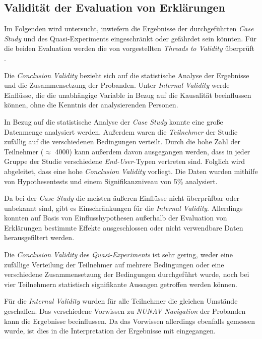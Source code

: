 \subsection{Validität der Evaluation von Erklärungen}

Im Folgenden wird untersucht, inwiefern die Ergebnisse der durchgeführten \textit{Case Study} und des Quasi-Experiments eingeschränkt oder gefährdet sein könnten. Für die beiden Evaluation werden die von \citeauthor{wohlin2012experimentation} vorgestellten \textit{Threads to Validity} überprüft \cite{wohlin2012experimentation}.

Die \textit{Conclusion Validity} bezieht sich auf die statistische Analyse der Ergebnisse und die Zusammensetzung der Probanden. Unter \textit{Internal Validity} werde Einflüsse, die die unabhängige Variable in Bezug auf die Kausalität beeinflussen können, ohne die Kenntnis der analysierenden Personen.

In Bezug auf die statistische Analyse der \textit{Case Study} konnte eine große Datenmenge analysiert werden. Außerdem waren die \textit{Teilnehmer} der Studie zufällig auf die verschiedenen Bedingungen verteilt. Durch die hohe Zahl der Teilnehmer ($\approx$ 4000) kann außerdem davon ausgegangen werden, dass in jeder Gruppe der Studie verschiedene \textit{End-User}-Typen vertreten sind. Folglich wird abgeleitet, dass eine hohe \textit{Conclusion Validity} vorliegt. Die Daten wurden mithilfe von Hypothesentests und einem Signifikanzniveau von 5\% analysiert.

Da bei der \textit{Case-Study} die meisten äußeren Einflüsse nicht überprüfbar oder unbekannt sind, gibt es Einschränkungen für die \textit{Internal Validity}. Allerdings konnten auf Basis von Einflusshypothesen außerhalb der Evaluation von Erklärungen bestimmte Effekte ausgeschlossen oder nicht verwendbare Daten herausgefiltert werden.

\smallskip

Die \textit{Conclusion Validity} des \textit{Quasi-Experiments} ist sehr gering, weder eine zufällige Verteilung der Teilnehmer auf mehrere Bedingungen oder eine verschiedene Zusammensetzung der Bedingungen durchgeführt wurde, noch bei vier Teilnehmern statistisch signifikante Aussagen getroffen werden können.

Für die \textit{Internal Validity} wurden für alle Teilnehmer die gleichen Umstände geschaffen. Das verschiedene Vorwissen zu \textit{NUNAV Navigation} der Probanden kann die Ergebnisse beeinflussen. Da das Vorwissen allerdings ebenfalls gemessen wurde, ist dies in die Interpretation der Ergebnisse mit eingegangen.


